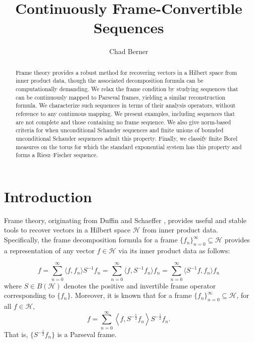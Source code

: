 \documentclass[11pt]{amsart}
\title{Continuously Frame-Convertible Sequences}
\author{Chad Berner}
\theoremstyle{definition}
\numberwithin{equation}{section}
\newcommand{\Hcal}{\mathcal{H}} %
\begin{document}
\maketitle

\begin{abstract}
Frame theory provides a robust method for recovering vectors in a Hilbert space from inner product data, though the associated decomposition formula can be computationally demanding. We relax the frame condition by studying sequences that can be continuously mapped to Parseval frames, yielding a similar reconstruction formula. We characterize such sequences in terms of their analysis operators, without reference to any continuous mapping. We present examples, including sequences that are not complete and those containing no frame sequence. We also give norm-based criteria for when unconditional Schauder sequences and finite unions of bounded unconditional Schauder sequences admit this property. Finally, we classify finite Borel measures on the torus for which the standard exponential system has this property and forms a Riesz–Fischer sequence.
\end{abstract}

\section{Introduction}

Frame theory, originating from Duffin and Schaeffer \cite{Duffin1952Class}, provides useful and stable tools to recover vectors in a Hilbert space $\Hcal$ from inner product data. Specifically, the frame decomposition formula for a frame $\{f_n\}_{n=0}^{\infty}\subseteq \Hcal$ provides a representation of any vector $f\in \Hcal$ via its inner product data as follows:

$$f=\sum_{n=0}^{\infty}\langle f, f_n\rangle S^{-1}f_n=\sum_{n=0}^{\infty}\langle f, S^{-1}f_n\rangle f_n=\sum_{n=0}^{\infty}\langle S^{-1}f, f_n\rangle f_n$$ where $S\in B(\Hcal)$ denotes the positive and invertible frame operator corresponding to $\{f_n\}$. Moreover, it is known that for a frame $\{f_n\}_{n=0}^{\infty}\subseteq \Hcal$, for all $f\in \Hcal$,
$$f=\sum_{n=0}^{\infty} \left\langle f, S^{-\frac{1}{2}}f_n \right\rangle S^{-\frac{1}{2}}f_n.$$ That is, $\{S^{-\frac{1}{2}}f_n\}$ is a Parseval frame.
\end{document}
